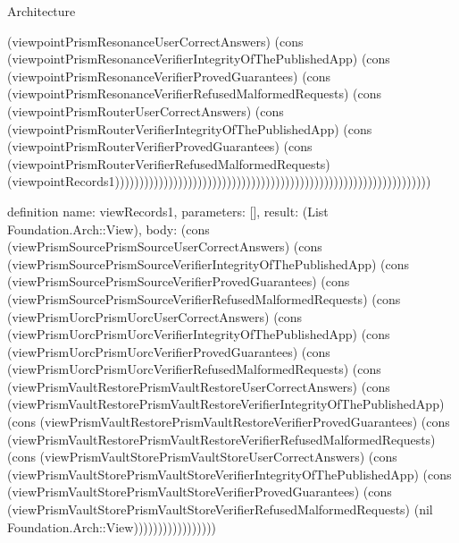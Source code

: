 \begin{lexlean}{Architecture}
\begin{semanticmodule}
{(viewpointPrismResonanceUserCorrectAnswers) (cons (viewpointPrismResonanceVerifierIntegrityOfThePublishedApp) (cons (viewpointPrismResonanceVerifierProvedGuarantees) (cons (viewpointPrismResonanceVerifierRefusedMalformedRequests) (cons (viewpointPrismRouterUserCorrectAnswers) (cons (viewpointPrismRouterVerifierIntegrityOfThePublishedApp) (cons (viewpointPrismRouterVerifierProvedGuarantees) (cons (viewpointPrismRouterVerifierRefusedMalformedRequests) (viewpointRecords1)))))))))))))))))))))))))))))))))))))))))))))))))))))))))))))))))
}

definition{
  name: viewRecords1,
  parameters: [],
  result: (List Foundation.Arch::View),
  body: (cons (viewPrismSourcePrismSourceUserCorrectAnswers) (cons (viewPrismSourcePrismSourceVerifierIntegrityOfThePublishedApp) (cons (viewPrismSourcePrismSourceVerifierProvedGuarantees) (cons (viewPrismSourcePrismSourceVerifierRefusedMalformedRequests) (cons (viewPrismUorcPrismUorcUserCorrectAnswers) (cons (viewPrismUorcPrismUorcVerifierIntegrityOfThePublishedApp) (cons (viewPrismUorcPrismUorcVerifierProvedGuarantees) (cons (viewPrismUorcPrismUorcVerifierRefusedMalformedRequests) (cons (viewPrismVaultRestorePrismVaultRestoreUserCorrectAnswers) (cons (viewPrismVaultRestorePrismVaultRestoreVerifierIntegrityOfThePublishedApp) (cons (viewPrismVaultRestorePrismVaultRestoreVerifierProvedGuarantees) (cons (viewPrismVaultRestorePrismVaultRestoreVerifierRefusedMalformedRequests) (cons (viewPrismVaultStorePrismVaultStoreUserCorrectAnswers) (cons (viewPrismVaultStorePrismVaultStoreVerifierIntegrityOfThePublishedApp) (cons (viewPrismVaultStorePrismVaultStoreVerifierProvedGuarantees) (cons (viewPrismVaultStorePrismVaultStoreVerifierRefusedMalformedRequests) (nil Foundation.Arch::View)))))))))))))))))
}


\end{semanticmodule}
\end{lexlean}
